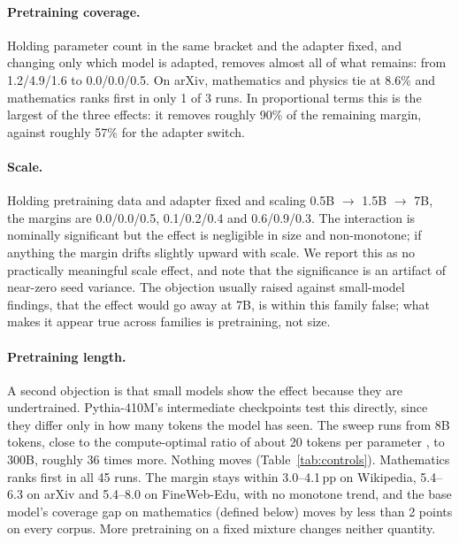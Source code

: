\documentclass[11pt]{article}
\begin{document}
\paragraph{Pretraining coverage.} Holding parameter count in the same
bracket and the adapter fixed, and changing only which model is adapted,
removes almost all of what remains: from 1.2/4.9/1.6 to 0.0/0.0/0.5. On
arXiv, mathematics and physics tie at 8.6\% and mathematics ranks first in
only 1 of 3 runs. In proportional terms this is the largest of the three effects: it removes roughly 90\% of the remaining margin, against roughly 57\% for the adapter switch.

\paragraph{Scale.} Holding pretraining data and adapter fixed and scaling
0.5B $\to$ 1.5B $\to$ 7B, the margins are 0.0/0.0/0.5, 0.1/0.2/0.4 and
0.6/0.9/0.3. The interaction is nominally significant but the effect is
negligible in size and non-monotone; if anything the margin drifts slightly
upward with scale. We report this as no practically meaningful scale effect,
and note that the significance is an artifact of near-zero seed variance.
The objection usually raised against small-model findings, that the effect
would go away at 7B, is within this family false; what makes it
appear true across families is pretraining, not size.

\paragraph{Pretraining length.} A second objection is that small models show
the effect because they are undertrained. Pythia-410M's intermediate
checkpoints test this directly, since they differ only in how many tokens
the model has seen. The sweep runs from 8B tokens, close to the
compute-optimal ratio of about 20 tokens per parameter
\citep{hoffmann2022chinchilla}, to 300B, roughly 36 times more. Nothing
moves (Table~\ref{tab:controls}). Mathematics ranks first in all 45 runs.
The margin stays within 3.0--4.1\,pp on Wikipedia, 5.4--6.3 on arXiv and
5.4--8.0 on FineWeb-Edu, with no monotone trend, and the base model's
coverage gap on mathematics (defined below) moves by less than 2 points on
every corpus. More pretraining on a fixed mixture changes neither quantity.
\end{document}

